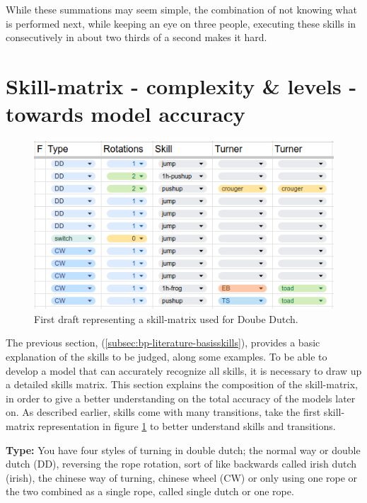 While these summations may seem simple, the combination of not knowing what is performed next, while keeping an eye on three people, executing these skills in consecutively in about two thirds of a second makes it hard.

\section{Skill-matrix - complexity \& levels - towards model accuracy}
\label{subsec:skillcomplexiteit}

\begin{figure}
    \centering
    \includegraphics[width=0.95\linewidth]{img/doubledutch-matrix}
    \caption[skill-matrix-DD]{First draft representing a skill-matrix used for Doube Dutch.}
    \label{fig:doubledutch-skill-matrix}
\end{figure}

The previous section, (\ref{subsec:bp-literature-basisskills}), provides a basic explanation of the skills to be judged, along some examples. To be able to develop a model that can accurately recognize all skills, it is necessary to draw up a detailed skills matrix. This section explains the composition of the skill-matrix, in order to give a better understanding on the total accuracy of the models later on. As described earlier, skills come with many transitions, take the first skill-matrix representation in figure \ref{fig:doubledutch-skill-matrix} to better understand skills and transitions.

\textbf{Type:} You have four styles of turning in double dutch; the normal way or double dutch (DD), reversing the rope rotation, sort of like backwards called irish dutch (irish), the chinese way of turning, chinese wheel (CW) or only using one rope or the two combined as a single rope, called single dutch or one rope.

